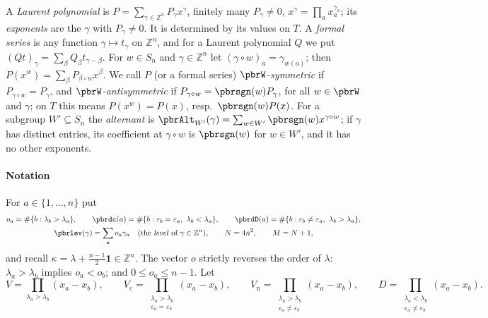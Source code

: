 \documentclass[10pt]{amsart}
\theoremstyle{definition}
\theoremstyle{remark}
\newcommand{\Z}{\mathbb Z}
\begin{document}
A \emph{Laurent polynomial} is $P=\sum_{\gamma\in\Z^n}P_\gamma x^\gamma$, finitely many $P_\gamma\ne0$,
$x^\gamma=\prod_ax_a^{\gamma_a}$; its \emph{exponents} are the $\gamma$ with $P_\gamma\ne0$. It is
determined by its values on $T$. A \emph{formal series} is any function $\gamma\mapsto t_\gamma$ on
$\Z^n$, and for a Laurent polynomial $Q$ we put $(Qt)_\gamma=\sum_\beta Q_\beta t_{\gamma-\beta}$.
For $w\in S_n$ and $\gamma\in\Z^n$ let $(\gamma\circ w)_a=\gamma_{w(a)}$; then
$P(x^w)=\sum_\beta P_{\beta\circ w}x^\beta$. We call $P$ (or a formal series) \emph{$\pbrW$-symmetric}
if $P_{\gamma\circ w}=P_\gamma$, and \emph{$\pbrW$-antisymmetric} if $P_{\gamma\circ w}=\pbrsgn(w)
P_\gamma$, for all $w\in\pbrW$ and $\gamma$; on $T$ this means $P(x^w)=P(x)$, resp.\ $\pbrsgn(w)P(x)$.
For a subgroup $W'\subseteq S_n$ the \emph{alternant} is $\pbrAlt_{W'}(\gamma)=\sum_{w\in W'}\pbrsgn(w)
x^{\gamma\circ w}$; if $\gamma$ has distinct entries, its coefficient at $\gamma\circ w$ is
$\pbrsgn(w)$ for $w\in W'$, and it has no other exponents.

\paragraph*{Notation}
For $a\in\{1,\dots,n\}$ put
\begin{gather*}
o_a=\#\{b:\lambda_b>\lambda_a\},\qquad \pbrdc(a)=\#\{b:\varepsilon_b=\varepsilon_a,\ \lambda_b<
\lambda_a\},\qquad \pbrdD(a)=\#\{b:\varepsilon_b\ne\varepsilon_a,\ \lambda_b>\lambda_a\},\\
\pbrlev(\gamma)=\sum_ao_a\gamma_a\quad(\text{the \emph{level} of }\gamma\in\Z^n),\qquad
N=4n^2,\qquad M=N+1,
\end{gather*}
and recall $\kappa=\lambda+\frac{n-1}2\mathbf 1\in\Z^n$. The vector $o$ strictly reverses the order
of $\lambda$: $\lambda_a>\lambda_b$ implies $o_a<o_b$; and $0\le o_a\le n-1$. Let
\[
V=\prod_{\lambda_a>\lambda_b}(x_a-x_b),\qquad V_{\mathrm c}=\prod_{\substack{\lambda_a>\lambda_b\\
\varepsilon_a=\varepsilon_b}}(x_a-x_b),\qquad V_{\mathrm n}=\prod_{\substack{\lambda_a>\lambda_b\\
\varepsilon_a\ne\varepsilon_b}}(x_a-x_b),\qquad D=\prod_{\substack{\lambda_a<\lambda_b\\
\varepsilon_a\ne\varepsilon_b}}(x_a-x_b).
\]
\end{document}
